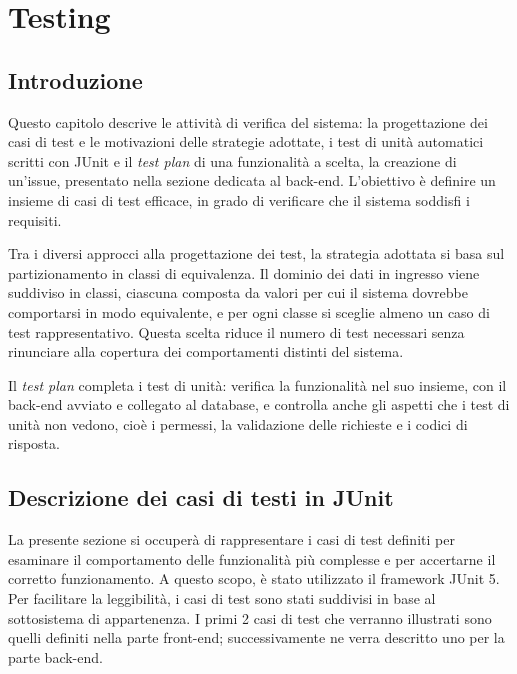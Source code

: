 \chapter{Testing} %

\label{Chapter3} %

\section{Introduzione}

Questo capitolo descrive le attività di verifica del sistema: la progettazione dei casi di test e le motivazioni delle strategie adottate, i test di unità automatici scritti con JUnit e il \textit{test plan} di una funzionalità a scelta, la creazione di un'issue, presentato nella sezione dedicata al back-end. L'obiettivo è definire un insieme di casi di test efficace, in grado di verificare che il sistema soddisfi i requisiti.

\noindent Tra i diversi approcci alla progettazione dei test, la strategia adottata si basa sul partizionamento in classi di equivalenza. Il dominio dei dati in ingresso viene suddiviso in classi, ciascuna composta da valori per cui il sistema dovrebbe comportarsi in modo equivalente, e per ogni classe si sceglie almeno un caso di test rappresentativo. Questa scelta riduce il numero di test necessari senza rinunciare alla copertura dei comportamenti distinti del sistema.

\noindent Il \textit{test plan} completa i test di unità: verifica la funzionalità nel suo insieme, con il back-end avviato e collegato al database, e controlla anche gli aspetti che i test di unità non vedono, cioè i permessi, la validazione delle richieste e i codici di risposta.

\section{Descrizione dei casi di testi in JUnit}
La presente sezione si occuperà di rappresentare i casi di test definiti per esaminare il comportamento delle funzionalità più complesse e per accertarne il corretto funzionamento. A questo scopo, è stato utilizzato il framework JUnit 5. \\
\indent Per facilitare la leggibilità, i casi di test sono stati suddivisi in base al sottosistema di appartenenza. I primi 2 casi di test che verranno illustrati sono quelli definiti nella parte front-end; successivamente ne verra descritto uno per la parte back-end.

